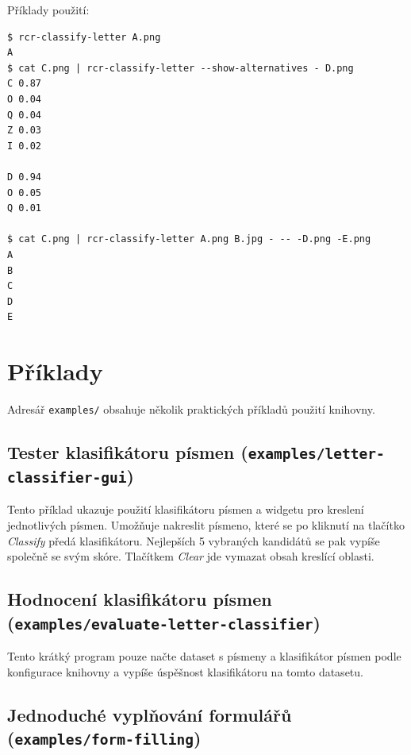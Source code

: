 \documentclass[a4paper]{article}
\begin{document}
Příklady použití:
\begin{lstlisting}
$ rcr-classify-letter A.png
A
$ cat C.png | rcr-classify-letter --show-alternatives - D.png
C 0.87
O 0.04
Q 0.04
Z 0.03
I 0.02

D 0.94
O 0.05
Q 0.01

$ cat C.png | rcr-classify-letter A.png B.jpg - -- -D.png -E.png
A
B
C
D
E
\end{lstlisting}

\section{Příklady}
Adresář \texttt{examples/} obsahuje několik praktických příkladů použití knihovny.

\subsection{Tester klasifikátoru písmen (\texttt{examples/letter-classifier-gui})}
Tento příklad ukazuje použití klasifikátoru písmen a widgetu pro kreslení
jednotlivých písmen. Umožňuje nakreslit písmeno, které se po kliknutí na
tlačítko \textit{Classify} předá klasifikátoru. Nejlepších 5 vybraných kandidátů
se pak vypíše společně se svým skóre. Tlačítkem \textit{Clear} jde vymazat obsah
kreslící oblasti.

\subsection{Hodnocení klasifikátoru písmen (\texttt{examples/evaluate-letter-classifier})}
Tento krátký program pouze načte dataset s písmeny a klasifikátor písmen podle
konfigurace knihovny a vypíše úspěšnost klasifikátoru na tomto datasetu.

\subsection{Jednoduché vyplňování formulářů (\texttt{examples/form-filling})}
\end{document}
